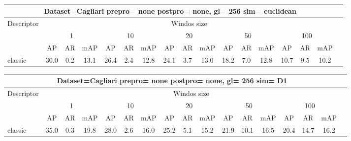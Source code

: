 \documentclass[12pt,italian]{article}
\begin{document}
\small
\begin{longtable}{lcccccccccccccccc}
\toprule
\multicolumn{16}{c}{Dataset=Cagliari prepro= none postpro= none, gl= 256 sim= euclidean} \\ 
\toprule
Descriptor & \multicolumn{15}{c}{Windos size} \\ 
& \multicolumn{3}{c}{1} & \multicolumn{3}{c}{10} & \multicolumn{3}{c}{20} & \multicolumn{3}{c}{50} & \multicolumn{3}{c}{100} \\ 
& AP & AR & mAP & AP & AR & mAP & AP & AR & mAP & AP & AR & mAP & AP & AR & mAP \\ 
\midrule
classic & 30.0 &  0.2 & 13.1 & 26.4 &  2.4 & 12.8 & 24.1 &  3.7 & 13.0 & 18.2 &  7.0 & 12.8 & 10.7 &  9.5 & 10.2 \\ 
\bottomrule
\end{longtable} 

 \pagebreak 
\begin{longtable}{lcccccccccccccccc}
\toprule
\multicolumn{16}{c}{Dataset=Cagliari prepro= none postpro= none, gl= 256 sim= D1} \\ 
\toprule
Descriptor & \multicolumn{15}{c}{Windos size} \\ 
& \multicolumn{3}{c}{1} & \multicolumn{3}{c}{10} & \multicolumn{3}{c}{20} & \multicolumn{3}{c}{50} & \multicolumn{3}{c}{100} \\ 
& AP & AR & mAP & AP & AR & mAP & AP & AR & mAP & AP & AR & mAP & AP & AR & mAP \\ 
\midrule
classic & 35.0 &  0.3 & 19.8 & 28.0 &  2.6 & 16.0 & 25.2 &  5.1 & 15.2 & 21.9 & 10.1 & 16.5 & 20.4 & 14.7 & 16.2 \\ 
\bottomrule
\end{longtable} 

 \pagebreak 
\end{document}
